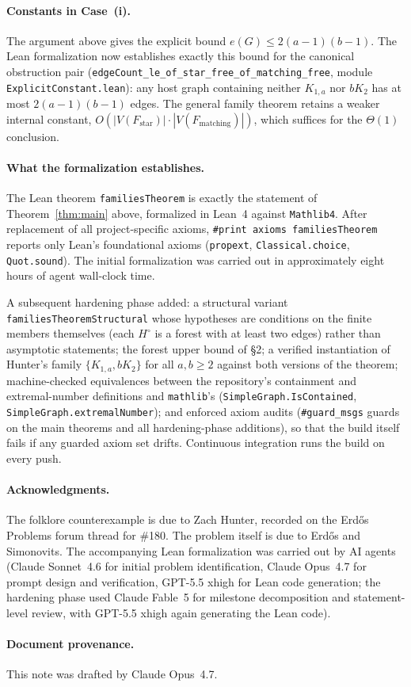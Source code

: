 \documentclass[11pt]{article}
\begin{document}
\paragraph{Constants in Case~(i).} The argument above gives the explicit
bound \(e(G)\le 2(a-1)(b-1)\). The Lean formalization now establishes
exactly this bound for the canonical obstruction pair
(\verb|edgeCount_le_of_star_free_of_matching_free|, module
\texttt{ExplicitConstant.lean}): any host graph containing neither
\(K_{1,a}\) nor \(bK_2\) has at most \(2(a-1)(b-1)\) edges. The
general family theorem retains a weaker internal constant,
\(O(|V(F_{\mathrm{star}})|\cdot |V(F_{\mathrm{matching}})|)\), which
suffices for the \(\Theta(1)\) conclusion.

\paragraph{What the formalization establishes.} The Lean theorem
\verb|familiesTheorem| is exactly the statement of Theorem~\ref{thm:main}
above, formalized in Lean~4 against \texttt{Mathlib4}. After replacement
of all project-specific axioms,
\verb|#print axioms familiesTheorem| reports only Lean's foundational
axioms (\texttt{propext}, \texttt{Classical.choice}, \texttt{Quot.sound}).
The initial formalization was carried out in approximately eight hours
of agent wall-clock time.

A subsequent hardening phase added: a structural variant
\verb|familiesTheoremStructural| whose hypotheses are conditions on the
finite members themselves (each $H^\circ$ is a forest with at least two
edges) rather than asymptotic statements; the forest upper bound of
\S2; a verified instantiation of Hunter's family $\{K_{1,a}, bK_2\}$
for all $a,b\ge 2$ against both versions of the theorem; machine-checked
equivalences between the repository's containment and extremal-number
definitions and \texttt{mathlib}'s (\verb|SimpleGraph.IsContained|,
\verb|SimpleGraph.extremalNumber|); and enforced axiom audits
(\verb|#guard_msgs| guards on the main theorems and all
hardening-phase additions), so that the build itself fails if any
guarded axiom set drifts. Continuous integration runs the build on
every push.

\paragraph{Acknowledgments.} The folklore counterexample is due to Zach
Hunter, recorded on the Erd\H{o}s Problems forum thread for \#180. The
problem itself is due to Erd\H{o}s and Simonovits. The accompanying Lean
formalization was carried out by AI agents (Claude Sonnet~4.6 for initial
problem identification, Claude Opus~4.7 for prompt design and
verification, GPT-5.5 xhigh for Lean code generation; the hardening
phase used Claude Fable~5 for milestone decomposition and
statement-level review, with GPT-5.5 xhigh again generating the Lean
code).

\paragraph{Document provenance.} This note was drafted by Claude
Opus~4.7.
\end{document}
